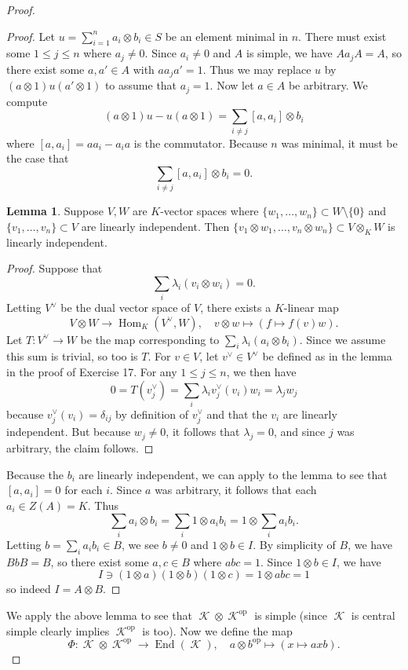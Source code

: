 \documentclass{article}
\theoremstyle{customplain}
\theoremstyle{customdef}
\DeclareMathOperator{\op}{\mathrm{op}}
\DeclareMathOperator{\End}{\mathrm{End}}
\DeclareMathOperator{\Hom}{\mathrm{Hom}}
\DeclareMathOperator{\calK}{\mathcal{K}}
\theoremstyle{definition} %
\newtheorem*{lemma*}{Lemma}
\renewcommand{\le}{\leqslant}
\begin{document}
\begin{proof}
\begin{proof}
        Let $u=\sum_{i=1}^n a_i \otimes b_i\in S$ be an element minimal in $n$. There must exist some $1\le j \le n$ where $a_j\ne 0$. Since $a_i\ne 0$ and $A$ is simple, we have $Aa_j A = A$, so there exist some $a, a'\in A$ with $aa_ja' = 1.$ Thus we may replace $u$ by $(a\otimes 1)u(a'\otimes 1)$ to assume that $a_j=1.$ Now let $a\in A$ be arbitrary. We compute
        \[
        (a\otimes 1)u-u(a\otimes 1) = \sum_{i\ne j}[a, a_i] \otimes b_i
        \]
        where $[a,a_i]=a a_i-a_i a$ is the commutator. Because $n$ was minimal, it must be the case that
        \[
        \sum_{i\ne j} [a, a_i] \otimes b_i = 0.
        \]
        \begin{lemma*}
            Suppose $V,W$ are $K$-vector spaces where $\{w_1, \dots, w_n\}\subset W\setminus \{0\}$ and $\{v_1, \dots, v_n\}\subset V$ are linearly independent. Then $\{v_1 \otimes w_1, \dots, v_n \otimes w_n\} \subset V\otimes_K W$ is linearly independent.
        \end{lemma*}
        \begin{proof}
            Suppose that 
            \[
            \sum_i \lambda_i (v_i \otimes w_i)=0.
            \]
            Letting $V^\vee$ be the dual vector space of $V$, there exists a $K$-linear map
            \[
            V\otimes W \to \Hom_K(V^\vee, W), \quad v\otimes w \mapsto (f\mapsto f(v)w).
            \]
            Let $T:V^\vee \to W$ be the map corresponding to $\sum_i \lambda_i (a_i \otimes b_i).$ Since we assume this sum is trivial, so too is $T.$ For $v\in V$, let $v^\vee \in V^\vee$ be defined as in the lemma in the proof of Exercise 17. For any $1\le j \le n$, we then have
            \[
            0=T(v_j^\vee) = \sum_i \lambda_i v_j^\vee(v_i) w_i = \lambda_j w_j
            \]
            because $v_j^\vee(v_i)=\delta_{ij}$ by definition of $v_j^\vee$ and that the $v_i$ are linearly independent. But because $w_j\ne 0$, it follows that $\lambda_j=0$, and since $j$ was arbitrary, the claim follows.
        \end{proof}
        Because the $b_i$ are linearly independent, we can apply to the lemma to see that $[a,a_i]=0$ for each $i$. Since $a$ was arbitrary, it follows that each $a_i \in Z(A)=K.$ Thus
        \[
        \sum_i a_i \otimes b_i = \sum_i 1 \otimes a_i b_i=1 \otimes \sum_i a_ib_i.
        \]
        Letting $b=\sum_i a_i b_i \in B$, we see $b\ne 0$ and $1\otimes b \in I$. By simplicity of $B$, we have $BbB=B$, so there exist some $a,c\in B$ where $abc = 1.$ Since $1\otimes b\in I$, we have
        \[
        I\ni (1\otimes a)(1\otimes b)(1\otimes c) = 1\otimes abc = 1
        \]
        so indeed $I=A\otimes B.$
    \end{proof}
    We apply the above lemma to see that $\calK \otimes \calK^{\op}$ is simple (since $\calK$ is central simple clearly implies $\calK^{\op}$ is too). Now we define the map $$\Phi:\calK \otimes \calK^{\op} \to \End(\calK), \quad a\otimes b^{\op} \mapsto (x\mapsto axb).$$


\end{proof}
\end{document}
